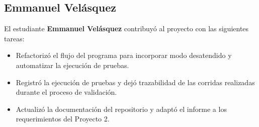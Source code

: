 \subsection{Emmanuel Velásquez}
El estudiante \textbf{Emmanuel Velásquez} contribuyó al proyecto con las siguientes tareas:
\begin{itemize}
    \item Refactorizó el flujo del programa para incorporar modo desatendido y automatizar la ejecución de pruebas.
    \item Registró la ejecución de pruebas y dejó trazabilidad de las corridas realizadas durante el proceso de validación.
    \item Actualizó la documentación del repositorio y adaptó el informe a los requerimientos del Proyecto 2.
\end{itemize}
